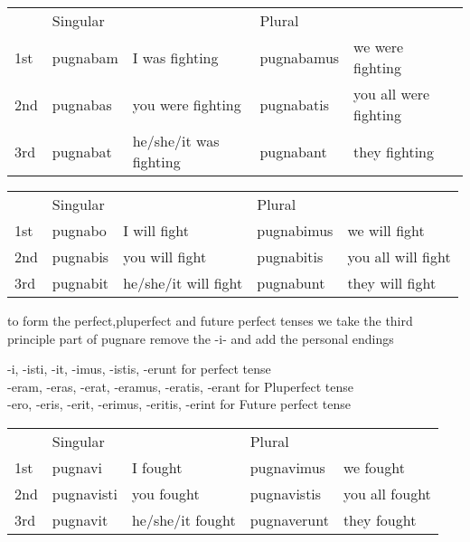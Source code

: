 \begin{center}  
  \begin{tabular}{lllll}
    \centering
    & Singular & & Plural &  \\
    1st & pugnabam & I was fighting & pugnabamus & we were fighting \\
    2nd & pugnabas & you were fighting & pugnabatis & you all were fighting \\ 
    3rd & pugnabat & he/she/it was fighting & pugnabant & they fighting \\
  \end{tabular}
\end{center}
\begin{center}  
  \begin{tabular}{lllll}
    \centering
    & Singular & & Plural &  \\
    1st & pugnabo & I will fight & pugnabimus & we will fight \\
    2nd & pugnabis & you will fight & pugnabitis & you all will fight \\ 
    3rd & pugnabit & he/she/it will fight & pugnabunt & they will fight \\
  \end{tabular}
\end{center}
to form the perfect,pluperfect and future perfect tenses we take the 
third principle part of pugnare remove the -i- and add 
the personal endings
\begin{center}
 -i, -isti, -it, -imus, -istis, -erunt for perfect tense \\
 -eram, -eras, -erat, -eramus, -eratis, -erant for Pluperfect tense \\
 -ero, -eris, -erit, -erimus, -eritis, -erint for Future perfect tense
\end{center}

\begin{center}  
  \begin{tabular}{lllll}
    \centering
    & Singular & & Plural &  \\
    1st & pugnavi & I fought & pugnavimus & we fought \\
    2nd & pugnavisti & you fought & pugnavistis & you all fought \\ 
    3rd & pugnavit & he/she/it fought & pugnaverunt & they fought \\
  \end{tabular}
\end{center}

